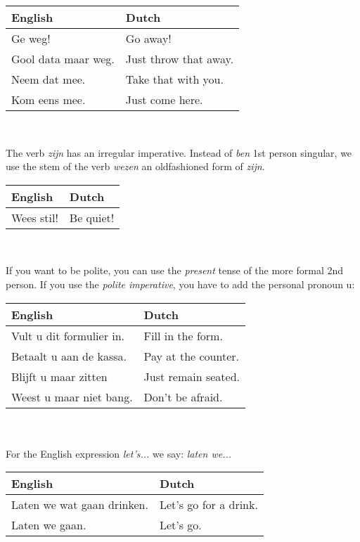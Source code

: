 \documentclass[letterpaper,11pt]{article}
\begin{document}
\begin{tabular}[t]{l l}
    \textbf{English}  & \textbf{Dutch} \\
    \hline
    Ge weg!             & Go away!              \\
    Gool data maar weg. & Just throw that away. \\
    Neem dat mee.       & Take that with you.   \\
    Kom eens mee.       & Just come here.       \\
    \hline
\end{tabular}
\\
\par{The verb \textit{zijn} has an irregular imperative. Instead of \textit{ben}
1st person singular, we use the stem of the verb \textit{wezen} an oldfashioned
form of \textit{zijn}.} 
\\
\begin{tabular}[t]{l l}
    \textbf{English}  & \textbf{Dutch} \\
    \hline
    Wees stil! & Be quiet! \\
    \hline
\end{tabular}
\\
\par{If you want to be polite, you can use the \textit{present} tense of the
more formal 2nd person. If you use the \textit{polite imperative}, you have to
add the personal pronoun u:} 
\\
\begin{tabular}[t]{l l}
    \textbf{English}  & \textbf{Dutch} \\
    \hline
    Vult u dit formulier in. & Fill in the form.   \\
    Betaalt u aan de kassa.  & Pay at the counter. \\
    Blijft u maar zitten     & Just remain seated. \\
    Weest u maar niet bang.  & Don't be afraid.    \\
    \hline
\end{tabular}
\\ \\
For the English expression \textit{let's...} we say: \textit{laten we...}
\\
\begin{tabular}[t]{l l}
    \textbf{English}           & \textbf{Dutch}        \\
    \hline
    Laten we wat gaan drinken. & Let's go for a drink. \\
    Laten we gaan.             & Let's go.             \\
    \hline
\end{tabular}
\end{document}
